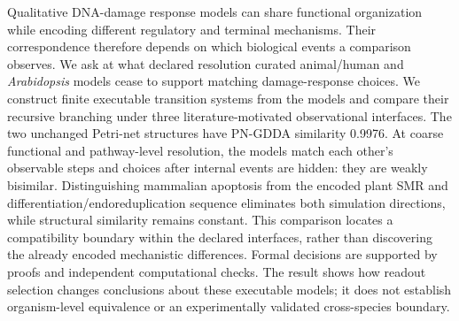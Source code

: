 Qualitative DNA-damage response models can share functional organization while
encoding different regulatory and terminal mechanisms. Their correspondence
therefore depends on which biological events a comparison observes. We ask at
what declared resolution curated animal/human and \textit{Arabidopsis} models
cease to support matching damage-response choices. We construct finite
executable transition systems from the models and compare their recursive
branching under three literature-motivated observational interfaces. The two
unchanged Petri-net structures have PN-GDDA similarity 0.9976. At coarse
functional and pathway-level resolution, the models match each other's
observable steps and choices after internal events are hidden: they are weakly
bisimilar. Distinguishing mammalian apoptosis from the encoded plant SMR and
differentiation/endoreduplication sequence eliminates both simulation directions,
while structural similarity remains constant. This comparison locates a
compatibility boundary within the declared interfaces, rather than discovering
the already encoded mechanistic differences. Formal decisions are supported by
proofs and independent computational checks. The result shows how readout
selection changes conclusions about these executable models; it does not
establish organism-level equivalence or an experimentally validated
cross-species boundary.
